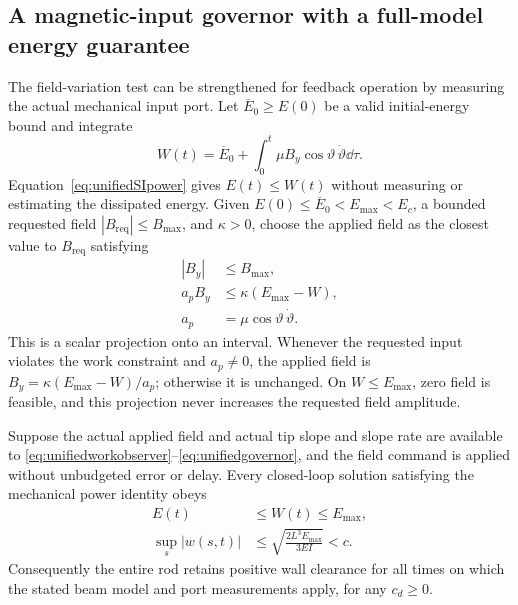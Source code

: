 \subsection{A magnetic-input governor with a full-model energy guarantee}
\label{sec:unifiedgovernor}
The field-variation test can be strengthened for feedback operation by
measuring the actual mechanical input port.  Let $\overline E_0\geq E(0)$
be a valid initial-energy bound and integrate
\begin{equation}
 W(t)=\overline E_0+\int_0^t
      \mu B_y\cos\vartheta\,\dot\vartheta\dd\tau.
 \label{eq:unifiedworkobserver}
\end{equation}
Equation~\eqref{eq:unifiedSIpower} gives $E(t)\leq W(t)$ without measuring
or estimating the dissipated energy.  Given $E(0)\leq\overline E_0<E_{\max}<E_c$,
a bounded requested field $|B_{\mathrm{req}}|\leq B_{\max}$, and $\kappa>0$,
choose the applied field as the closest value to $B_{\mathrm{req}}$ satisfying
\begin{equation}
 \begin{aligned}
 |B_y|&\leq B_{\max},\\
 a_p B_y&\leq\kappa(E_{\max}-W),\\
 a_p&=\mu\cos\vartheta\,\dot\vartheta.
 \end{aligned}
 \label{eq:unifiedgovernor}
\end{equation}
This is a scalar projection onto an interval.  Whenever the requested input
violates the work constraint and $a_p\ne0$, the applied field is
$B_y=\kappa(E_{\max}-W)/a_p$; otherwise it is unchanged.
On $W\leq E_{\max}$, zero field is feasible, and this projection never
increases the requested field amplitude.

\begin{proposition}
\label{prop:unifiedgovernor}
Suppose the actual applied field and actual tip slope and slope rate are
available to \eqref{eq:unifiedworkobserver}--\eqref{eq:unifiedgovernor},
and the field command is applied without unbudgeted error or delay.
Every closed-loop solution satisfying the mechanical power identity obeys
\begin{equation}
 \begin{aligned}
 E(t)&\leq W(t)\leq E_{\max},\\
 \sup_s|w(s,t)|&\leq\sqrt{\frac{2L^3E_{\max}}{3EI}}<c.
 \end{aligned}
 \label{eq:unifiedgovernorbound}
\end{equation}
Consequently the entire rod retains positive wall clearance for all times
on which the stated beam model and port measurements apply, for any $c_d\geq0$.
\end{proposition}

